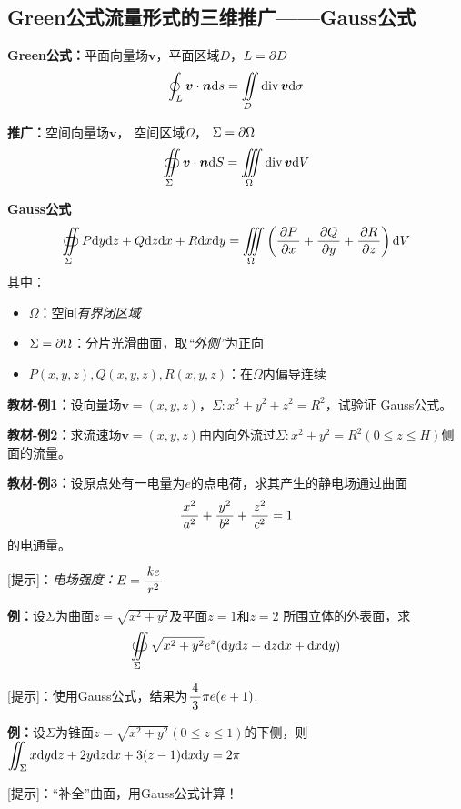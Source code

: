 \subsection{Green公式流量形式的三维推广——Gauss公式}

{\bf Green公式：}平面向量场$\bm{v}$，平面区域$D$，$L=\partial D$
$${\oint_L\bm{v}\cdot\bm{n}\mathrm{d} s=\iint\limits_D\mathrm{div}\,\bm{v}\mathrm{d}\sigma}$$

{\bf 推广：}空间向量场$\bm{v}$， 空间区域$\Omega$， $\Sigma=\partial\Omega$
$${\oiint\limits_{\Sigma}\bm{v}\cdot\bm{n}\mathrm{d}
S=\iiint\limits_{\Omega}\mathrm{div}\,\bm{v}\mathrm{d} V}$$

\begin{thx}
	{\bf Gauss公式}
	$$\oiint\limits_{\Sigma}P\mathrm{d} y\mathrm{d} z+Q\mathrm{d} z\mathrm{d} x+R\mathrm{d} x\mathrm{d} y=\iiint\limits_{\Omega}
	\left(\displaystyle\frac{\,{\partial P}\,}{\,{\partial x}\,}+\displaystyle\frac{\,{\partial Q}\,}{\,{\partial y}\,}+\displaystyle\frac{\,{\partial R}\,}{\,{\partial z}\,}\right)\mathrm{d} V$$
	其中：
	\begin{itemize}
	  \item {$\Omega$：}空间{\it 有界闭区域}
	  \item {$\Sigma=\partial\Omega$：}分片光滑曲面，取{\it “外侧”}为正向
	  \item {$P(x,y,z),Q(x,y,z),R(x,y,z)$：}在$\Omega$内偏导连续
	\end{itemize}
\end{thx}

{\bf 教材-例1：}设向量场$\bm{v}=(x,y,z)$，$\Sigma:x^2+y^2+z^2=R^2$，试验证
Gauss公式。

{\bf 教材-例2：}求流速场$\bm{v}=(x,y,z)$由内向外流过$\Sigma:x^2+y^2=R^2
(0\leq z\leq H)$侧面的流量。

{\bf 教材-例3：}设原点处有一电量为$e$的点电荷，求其产生的静电场通过曲面
$$\displaystyle\frac{\,{x^2}\,}{\,{a^2}\,}+\displaystyle\frac{\,{y^2}\,}{\,{b^2}\,}+\displaystyle\frac{\,{z^2}\,}{\,{c^2}\,}=1$$
的电通量。

[提示]：{\it 电场强度：}${E=\displaystyle\frac{\,{ke}\,}{\,{r^2}\,}}$

{\bf 例：}设$\Sigma$为曲面$z=\sqrt{x^2+y^2}$及平面$z=1$和$z=2$
所围立体的外表面，求
$$\oiint\limits_{\Sigma}\sqrt{x^2+y^2}e^z(\mathrm{d} y\mathrm{d} z+\mathrm{d} z\mathrm{d} x+\mathrm{d} x\mathrm{d} y)$$

[提示]：使用Gauss公式，结果为$\displaystyle\frac{\,{4}\,}{\,{3}\,}\pi e(e+1)$.

{\bf 例：}设$\Sigma$为锥面$z=\sqrt{x^2+y^2}(0\leq z\leq 1)$的下侧，则
$\displaystyle\iint_{\Sigma}x\mathrm{d} y\mathrm{d} z+2y\mathrm{d} z\mathrm{d} x+3(z-1)\mathrm{d} x\mathrm{d} y=2\pi$

[提示]：“补全”曲面，用Gauss公式计算！

